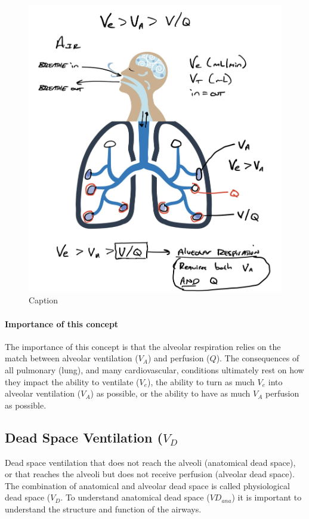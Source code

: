 \begin{figure}
    \centering
    \includegraphics[width = 1.0\linewidth]{./figure/ve_va.jpg}
    \caption{Caption}
    \label{fig:ve_va.jpg}
\end{figure}

\paragraph{Importance of this concept}
The importance of this concept is that the alveolar respiration relies on the match between alveolar ventilation ($V_A$) and perfusion ($Q$). The consequences of all pulmonary (lung), and many cardiovascular, conditions ultimately rest on how they impact the ability to ventilate ($V_e$), the ability to turn as much $V_e$ into alveolar ventilation ($V_A$) as possible, or the ability to have as much $V_A$ perfusion as possible.

\subsection{Dead Space Ventilation ($V_D$}
Dead space ventilation that does not reach the alveoli (anatomical dead space), or that reaches the alveoli but does not receive perfusion (alveolar dead space). The combination of anatomical and alveolar dead space is called physiological dead space ($V_D$. To understand anatomical dead space ($VD_{ana}$) it is important to understand the structure and function of the airways.

